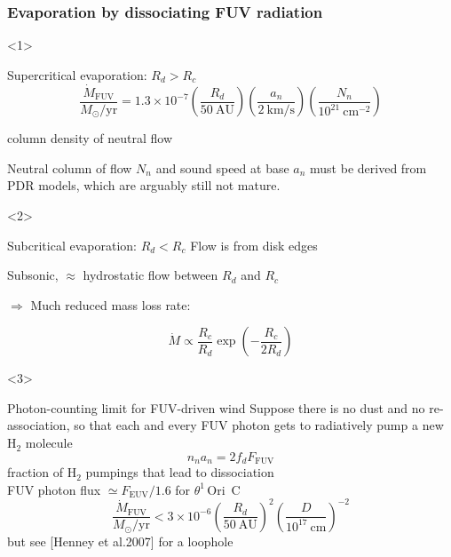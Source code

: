 \documentclass[presentation]{beamer}
\begin{document}
\begin{frame}  \frametitle{Evaporation by dissociating FUV radiation}
  
  \begin{onlyenv}<1>
    \begin{block}{Supercritical evaporation: $R_d > R_c$}
      \[
      \frac{\dot M_{\mathrm{FUV}}}{M_{\odot}/\mathrm{yr}} = 1.3\times
      10^{-7} \left(\frac{R_d}{50~\mathrm{AU}}\right)
      \left(\frac{a_n}{2~\mathrm{km/s}}\right)
      \left(\frac{N_n}{10^{21}~\mathrm{cm^{-2}}}\right)
      \]
    \end{block}
    \begin{exampleblock}{}
       column density of neutral flow
    \end{exampleblock}
    Neutral column of flow $N_n$ and sound speed at base $a_n$ must be
    derived from PDR models, which are arguably still not mature.  
    \begin{alertblock}{}\tiny
    \end{alertblock}
  \end{onlyenv}
  \begin{onlyenv}<2>
    \begin{block}{Subcritical evaporation: $R_d < R_c$}
      Flow is from disk edges
      \smallskip

      Subsonic, $\approx$ hydrostatic flow between $R_d$ and $R_c$
      \smallskip

      $\Rightarrow$ Much reduced mass loss rate:

      \[
      \dot M \propto \frac{R_c}{R_d} \exp\left(-\frac{R_c}{2 R_d}\right)
      \]
    \end{block}
    \begin{alertblock}{}\tiny
      \quad
    \end{alertblock}
  \end{onlyenv}

  \begin{onlyenv}<3>
    \begin{block}{Photon-counting limit for FUV-driven wind}
      Suppose there is no dust and no re-association, so that each and
      every FUV photon gets to radiatively pump a new H$_2$
      molecule
      \[
      n_n a_n = 2 f_d F_{\mathrm{FUV}}  
      \]
       fraction of H$_2$ pumpings that lead to dissociation\\
       FUV photon flux $\simeq
      F_{\mathrm{EUV}} / 1.6$ for $\theta^1\,$Ori~C
      \[
      \frac{\dot M_{\mathrm{FUV}}}{M_{\odot}/\mathrm{yr}} 
      < 3\times 10^{-6} 
      \left(\frac{R_d}{50~\mathrm{AU}}\right)^2
      \left(\frac{D}{10^{17}~\mathrm{cm}}\right)^{-2}
      \]
      \tiny
       but see [Henney et al.\@ 2007] for a loophole
    \end{block}
  \end{onlyenv}


\end{frame}
\end{document}
